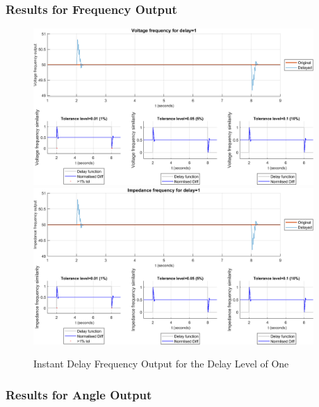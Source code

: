 \newpage \subsubsection{Results for Frequency Output}
\begin{figure}[bp]
    \caption{Instant Delay Frequency Output for the Delay Level of One}
    \includegraphics[width=0.95\textwidth]{PMUsim-figures/DelayOf_1/Instant_vFrequency.png}    
  \includegraphics[width=0.95\textwidth]{PMUsim-figures/DelayOf_1/Instant_iFrequency.png}    
    \label{fig:PMUsim_One_Frequency}
\end{figure}
\newpage \subsubsection{Results for Angle Output}
